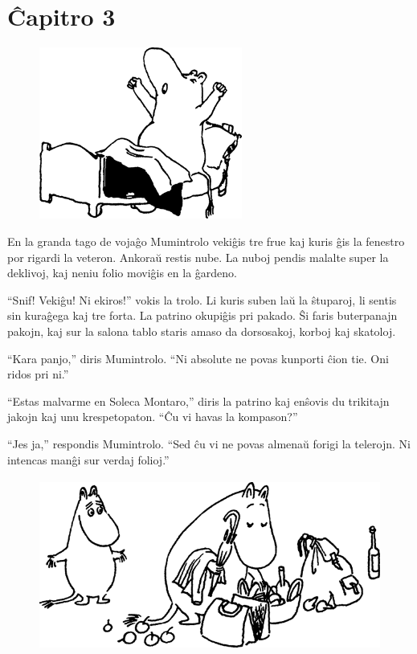 \chapter*[Ĉapitro 3]{Ĉapitro 3}


\begin{figure}[htbp]
\centering
\includegraphics[width=189pt,height=160pt]{3-1.png}
\caption{}
\label{3-1}
\end{figure}

En la granda tago de vojaĝo Mumintrolo vekiĝis tre frue kaj kuris ĝis la fenestro por rigardi la veteron. Ankoraŭ restis nube. La nuboj pendis malalte super la deklivoj, kaj neniu folio moviĝis en la ĝardeno.

``Snif! Vekiĝu! Ni ekiros!'' vokis la trolo. Li kuris suben laŭ la ŝtuparoj, li sentis sin kuraĝega kaj tre forta. La patrino okupiĝis pri pakado. Ŝi faris buterpanajn pakojn, kaj sur la salona tablo staris amaso da dorsosakoj, korboj kaj skatoloj.

``Kara panjo,'' diris Mumintrolo. ``Ni absolute ne povas kunporti ĉion tie. Oni ridos pri ni.''

``Estas malvarme en Soleca Montaro,'' diris la patrino kaj enŝovis du trikitajn jakojn kaj unu krespetopaton. ``Ĉu vi havas la kompason?''

``Jes ja,'' respondis Mumintrolo. ``Sed ĉu vi ne povas almenaŭ forigi la telerojn. Ni intencas manĝi sur verdaj folioj.''

\begin{figure}[htbp]
\centering
\includegraphics[width=331pt,height=160pt]{3-2.png}
\caption{}
\label{3-2}
\end{figure}

